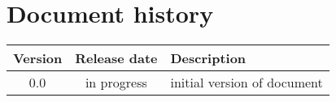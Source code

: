 \chapter{Document history}

\begin{longtable}{ccp{}}
\toprule
Version & Release date & Description \\
\midrule
0.0 & in progress & initial version of document \\
\bottomrule
\end{longtable}

